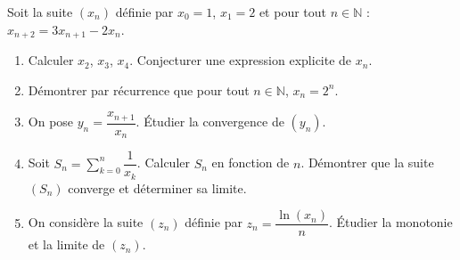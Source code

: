 \documentclass[11pt]{article}
\begin{document}
\begin{exercice}
Soit la suite $(x_n)$ définie par $x_0 = 1$, $x_1 = 2$ et pour tout $n \in \mathbb{N}$ : $x_{n+2} = 3x_{n+1} - 2x_n$.
\begin{enumerate}
    \item Calculer $x_2$, $x_3$, $x_4$. Conjecturer une expression explicite de $x_n$.
    \item Démontrer par récurrence que pour tout $n \in \mathbb{N}$, $x_n = 2^n$.
    \item On pose $y_n = \dfrac{x_{n+1}}{x_n}$. Étudier la convergence de $(y_n)$.
    \item Soit $S_n = \sum_{k=0}^{n} \dfrac{1}{x_k}$. Calculer $S_n$ en fonction de $n$. Démontrer que la suite $(S_n)$ converge et déterminer sa limite.
    \item On considère la suite $(z_n)$ définie par $z_n = \dfrac{\ln(x_n)}{n}$. Étudier la monotonie et la limite de $(z_n)$.
\end{enumerate}
\end{exercice}
\end{document}
